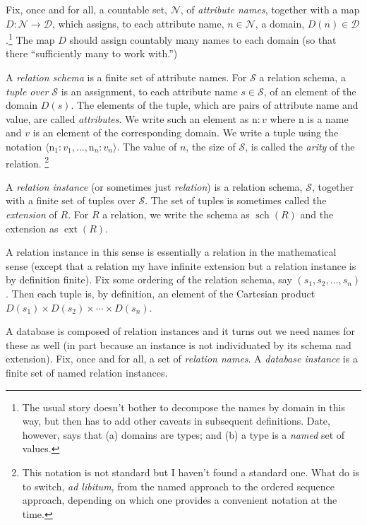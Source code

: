 \documentclass[10pt, a4paper, twocolumn]{article}
\DeclareMathOperator{\schema}{sch}
\DeclareMathOperator{\extension}{ext}
\begin{document}
Fix, once and for all, a countable set, $\mathscr{N}$, of \emph{attribute
names}, together with a map $D:\mathscr{N}\to\mathscr{D}$, which assigns, to each
attribute name, $n\in\mathscr{N}$, a domain, $D(n)\in\mathscr{D}$.\footnote{The
usual story doesn't bother to decompose the names by domain in this way, but
then has to add other caveats in subsequent definitions. Date, however, says
that (a) domains are types; and (b) a type is a \emph{named} set of values.} The
map $D$ should assign countably many names to each domain (so that there
``sufficiently many to work with.'')

A \emph{relation schema} is a finite set of attribute names. For $\mathcal{S}$ a relation
schema, a \emph{tuple over $\mathcal{S}$} is an assignment, to each attribute name $s\in\mathcal{S}$,
of an element of the domain $D(s)$. The elements of the tuple, which are pairs
of attribute name and value, are called \emph{attributes}. We write such an
element as $\mathrm{n}\colon v$ where $\mathrm{n}$ is a name and $v$ is an
element of the corresponding domain. We write a tuple using the notation
$\langle\mathrm{n}_1\colon v_1, \dotsc, \mathrm{n}_n\colon v_n \rangle$. The value of $n$,
the size of $\mathcal{S}$, is called the \emph{arity} of the relation.%
\footnote{This notation is not standard but I haven't found a standard one. What
\textcite{abiteboul1995foundations} do is to switch, \textit{ad libitum}, from
the named approach to the ordered sequence approach, depending on which one
provides a convenient notation at the time.}

A \emph{relation instance} (or sometimes just \emph{relation}) is a relation
schema, $\mathcal{S}$, together with a finite set of tuples over $\mathcal{S}$. The set of tuples is
sometimes called the \emph{extension} of $R$. For $R$ a relation, we write the
schema as $\schema(R)$ and the extension as $\extension(R)$.

A relation instance in this sense is essentially a relation in the mathematical
sense (except that a relation my have infinite extension but a relation instance
is by definition finite). Fix some ordering of the relation schema, say $(s_1,
s_2, \dotsc, s_n)$. Then each tuple is, by definition, an element of the
Cartesian product $D(s_1)\times D(s_2) \times\dotsb \times D(s_n)$. 

A database is composed of relation instances and it turns out we need names for
these as well (in part because an instance is not individuated by its schema nad
extension). Fix, once and for all, a set of \emph{relation names}. A
\emph{database instance} is a finite set of named relation instances.
\end{document}

